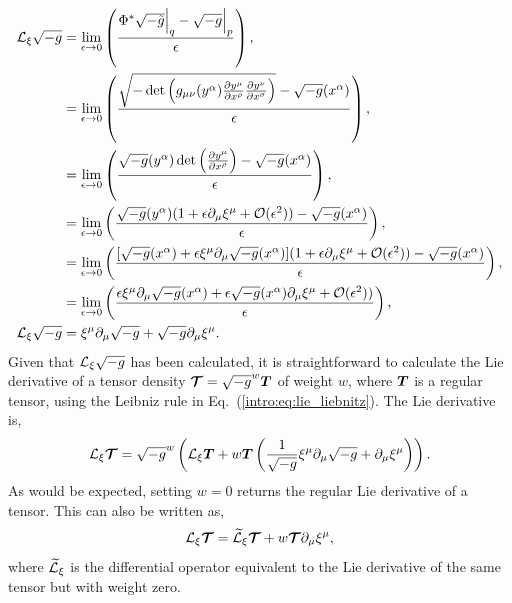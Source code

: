 \begin{align}
\mathcal{L}_\xi \sqrt{-g} &= \lim_{\epsilon\rightarrow 0 }\left( \frac{\Phi^*\sqrt{-\tilde{g}}\Big|_q-\sqrt{-g}\Big|_p}{\epsilon} \right) ,\\
&= \lim_{\epsilon\rightarrow 0 }\left( \frac{\sqrt{-\det\left(g_{\mu\nu}(y^\alpha){\frac{\partial y^\mu}{\partial x^\rho}  \frac{\partial y^\nu}{\partial x^\sigma}}\right)}-\sqrt{-g}(x^\alpha)}{\epsilon} \right) ,\\
&= \lim_{\epsilon\rightarrow 0 }\left( \frac{\sqrt{-g}(y^\alpha) \det\left(\frac{\partial y^\mu}{\partial x^\rho}\right) -\sqrt{-g}(x^\alpha)}{\epsilon} \right) ,\\
&= \lim_{\epsilon\rightarrow 0 }\left( \frac{\sqrt{-g}(y^\alpha) (1 + \epsilon \partial_\mu \xi^\mu + \mathcal{O}(\epsilon^2)) -\sqrt{-g}(x^\alpha)}{\epsilon} \right) ,\\
&= \lim_{\epsilon\rightarrow 0 }\left( \frac{[\sqrt{-g}(x^\alpha) + \epsilon \xi^\mu \partial_\mu \sqrt{-g}(x^\alpha)] (1 + \epsilon \partial_\mu \xi^\mu + \mathcal{O}(\epsilon^2)) -\sqrt{-g}(x^\alpha)}{\epsilon} \right) ,\\
&= \lim_{\epsilon\rightarrow 0 }\left( \frac{ \epsilon \xi^\mu \partial_\mu \sqrt{-g}(x^\alpha) + \epsilon \sqrt{-g}(x^\alpha)\partial_\mu \xi^\mu + \mathcal{O}(\epsilon^2))}{\epsilon}  \right) ,\\
\mathcal{L}_\xi \sqrt{-g} &= \xi^\mu \partial_\mu \sqrt{-g} + \sqrt{-g} \partial_\mu \xi^\mu.
\end{align}
Given that $\mathcal{L}_\xi \sqrt{-g}$ has been calculated, it is straightforward to calculate the Lie derivative of a tensor density $\boldsymbol{\mathcal{T}} = \sqrt{-g}^w\boldsymbol{T}$ of weight $w$, where $\boldsymbol{T}$ is a regular tensor, using the Leibniz rule in Eq.~(\ref{intro:eq:lie_liebnitz}). The Lie derivative is,
\begin{equation} \label{intro:eq:Ltensordensity}
\mathcal{L}_\xi \boldsymbol{\mathcal{T}} = \sqrt{-g}^w \left( \mathcal{L}_\xi \boldsymbol{T} + w \boldsymbol{T} \left(   \frac{1}{\sqrt{-g}} \xi^\mu \partial_\mu \sqrt{-g} + \partial_\mu \xi^\mu \right) \right).
\end{equation}
As would be expected, setting $w=0$ returns the regular Lie derivative of a tensor. This can also be written as,
\begin{equation} \label{intro:eq:Ltensordensity2}
\mathcal{L}_\xi \boldsymbol{\mathcal{T}} =  \widetilde{\mathcal{L}}_\xi \boldsymbol{\mathcal{T}} + w \boldsymbol{\mathcal{T}}  \partial_\mu \xi^\mu ,
\end{equation}
where $ \widetilde{\mathcal{L}}_\xi$ is the differential operator equivalent to the Lie derivative of the same tensor but with weight zero.





